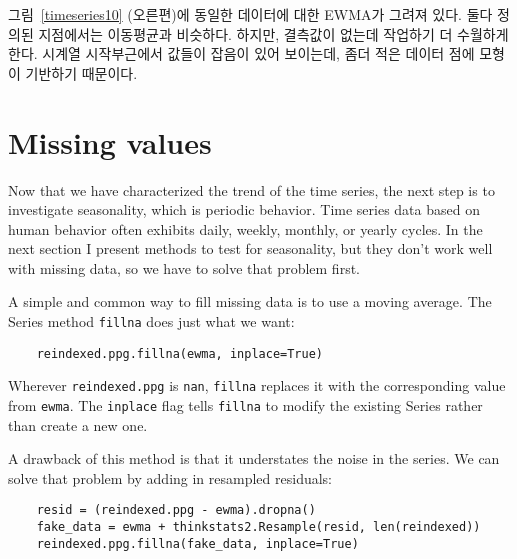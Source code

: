 그림~\ref{timeseries10} (오른편)에 동일한 데이터에 대한 EWMA가 그려져 있다. 둘다 정의된 지점에서는 이동평균과 비슷하다. 하지만, 결측값이 없는데 작업하기 더 수월하게 한다. 시계열 시작부근에서 값들이 잡음이 있어 보이는데, 좀더 적은 데이터 점에 모형이 기반하기 때문이다.


\section{Missing values}

Now that we have characterized the trend of the time series, the
next step is to investigate seasonality, which is periodic behavior.
Time series data based on human behavior often exhibits daily,
weekly, monthly, or yearly cycles.  In the next section I present
methods to test for seasonality, but they don't work well with
missing data, so we have to solve that problem first.

A simple and common way to fill missing data is to use a moving
average.  The Series method {\tt fillna} does just what we want:

\begin{verbatim}
    reindexed.ppg.fillna(ewma, inplace=True)
\end{verbatim}

Wherever {\tt reindexed.ppg} is {\tt nan}, {\tt fillna} replaces
it with the corresponding value from {\tt ewma}.  The {\tt inplace}
flag tells {\tt fillna} to modify the existing Series rather than
create a new one.

A drawback of this method is that it understates the noise in the
series.  We can solve that problem by adding in resampled
residuals:

\begin{verbatim}
    resid = (reindexed.ppg - ewma).dropna()
    fake_data = ewma + thinkstats2.Resample(resid, len(reindexed))
    reindexed.ppg.fillna(fake_data, inplace=True)
\end{verbatim}


